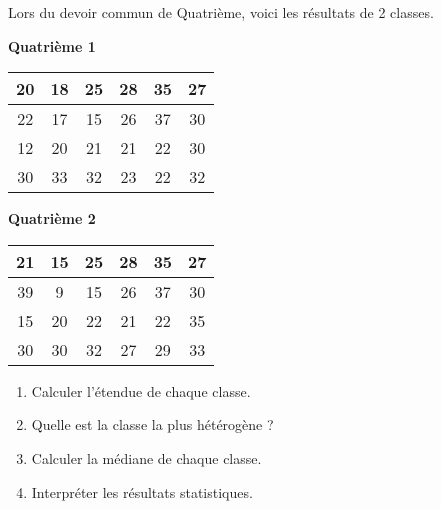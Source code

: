 
Lors du devoir commun de Quatrième, voici les résultats de 2 classes.

\begin{minipage}{0.5\linewidth}
\begin{center}
\textbf{Quatrième  1}


\begin{tabular}{|c|c|c|c|c|c|}
\hline 
20 & 18 & 25 & 28& 35 & 27 \\ 
\hline 
22 & 17 & 15 & 26 &37 & 30 \\ 
\hline 
12 & 20 & 21 & 21 & 22 & 30 \\ 
\hline 
30 & 33 & 32 & 23 & 22 & 32 \\ 
\hline 
\end{tabular} 
\end{center}
\end{minipage}
\begin{minipage}{0.5\linewidth}
\begin{center}
\textbf{Quatrième  2}


\begin{tabular}{|c|c|c|c|c|c|}
\hline 
21 & 15 & 25 & 28& 35 & 27 \\ 
\hline 
39 & 9 & 15 & 26 &37 & 30 \\ 
\hline 
15 & 20 & 22 & 21 & 22 & 35 \\ 
\hline 
30 & 30 & 32 & 27 & 29 & 33 \\ 
\hline 
\end{tabular} 
\end{center}
\end{minipage}

\begin{enumerate}
\item Calculer l'étendue de chaque classe.
\item Quelle est la classe la plus hétérogène ?
\item Calculer la médiane de chaque classe.
\item Interpréter les résultats statistiques.
\end{enumerate}